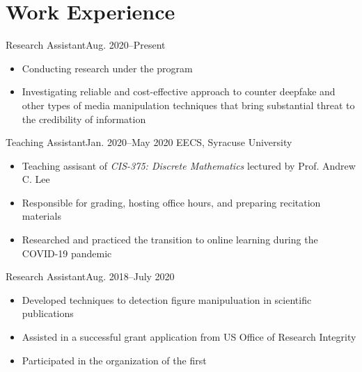 \documentclass[letterpaper, 11pt]{article}
\begin{document}
\section{Work Experience}

\begin{itemize}

\begin{itemntl}{Research Assistant}{Aug. 2020--Present}
{}

\begin{itemize}
\item Conducting research under the  program
\item Investigating reliable and cost-effective approach to counter deepfake and other types of media manipulation techniques that bring substantial threat to the credibility of information
\end{itemize}
\end{itemntl}

\begin{itemntl}{Teaching Assistant}{Jan. 2020--May 2020}
{EECS, Syracuse University}

\begin{itemize}
\item Teaching assisant of \textit{CIS-375: Discrete Mathematics} lectured by Prof. Andrew C. Lee
\item Responsible for grading, hosting office hours, and preparing recitation materials
\item Researched and practiced the transition to online learning during the COVID-19 pandemic
\end{itemize}
\end{itemntl}

\begin{itemntl}{Research Assistant}{Aug. 2018--July 2020}
{}
\begin{itemize}
\item Developed techniques to detection figure manipuluation in scientific publications
\item Assisted in a successful grant application from US Office of Research Integrity
\item Participated in the organization of the first 
\end{itemize}

\end{itemntl}

\end{itemize}
\end{document}
